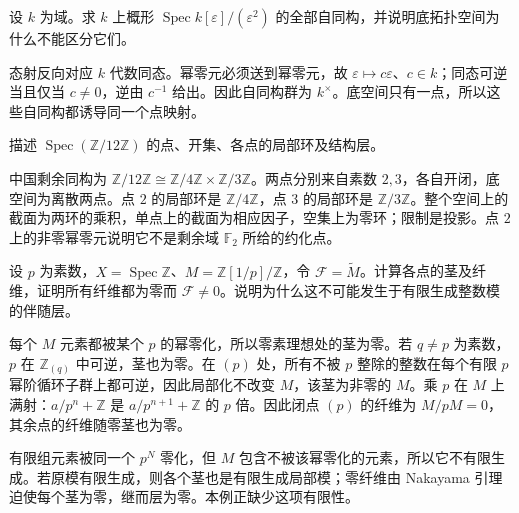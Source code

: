 \begin{optionalexercise}\label{b3:ex:24-infinitesimal-automorphisms}
	设 \(k\) 为域。求 \(k\) 上概形 \(\operatorname{Spec}k[\varepsilon]/(\varepsilon^2)\) 的全部自同构，并说明底拓扑空间为什么不能区分它们。
\end{optionalexercise}
\begin{solution}
	态射反向对应 \(k\) 代数同态。幂零元必须送到幂零元，故 \(\varepsilon\mapsto c\varepsilon\)、\(c\in k\)；同态可逆当且仅当 \(c\ne0\)，逆由 \(c^{-1}\) 给出。因此自同构群为 \(k^\times\)。底空间只有一点，所以这些自同构都诱导同一个点映射。
\end{solution}

\begin{optionalexercise}\label{b3:ex:24-arithmetic-two-points}
	描述 \(\operatorname{Spec}(\mathbb Z/12\mathbb Z)\) 的点、开集、各点的局部环及结构层。
\end{optionalexercise}
\begin{solution}
	中国剩余同构为 \(\mathbb Z/12\mathbb Z\cong\mathbb Z/4\mathbb Z\times\mathbb Z/3\mathbb Z\)。两点分别来自素数 \(2,3\)，各自开闭，底空间为离散两点。点 \(2\) 的局部环是 \(\mathbb Z/4\mathbb Z\)，点 \(3\) 的局部环是 \(\mathbb Z/3\mathbb Z\)。整个空间上的截面为两环的乘积，单点上的截面为相应因子，空集上为零环；限制是投影。点 \(2\) 上的非零幂零元说明它不是剩余域 \(\mathbb F_2\) 所给的约化点。
\end{solution}

\begin{optionalexercise}\label{b3:ex:24-rational-module-fibers}
	设 \(p\) 为素数，\(X=\operatorname{Spec}\mathbb Z\)、\(M=\mathbb Z[1/p]/\mathbb Z\)，令 \(\mathcal F=\widetilde M\)。计算各点的茎及纤维，证明所有纤维都为零而 \(\mathcal F\ne0\)。说明为什么这不可能发生于有限生成整数模的伴随层。
\end{optionalexercise}
\begin{solution}
	每个 \(M\) 元素都被某个 \(p\) 的幂零化，所以零素理想处的茎为零。若 \(q\ne p\) 为素数，\(p\) 在 \(\mathbb Z_{(q)}\) 中可逆，茎也为零。在 \((p)\) 处，所有不被 \(p\) 整除的整数在每个有限 \(p\) 幂阶循环子群上都可逆，因此局部化不改变 \(M\)，该茎为非零的 \(M\)。乘 \(p\) 在 \(M\) 上满射：\(a/p^n+\mathbb Z\) 是 \(a/p^{n+1}+\mathbb Z\) 的 \(p\) 倍。因此闭点 \((p)\) 的纤维为 \(M/pM=0\)，其余点的纤维随零茎也为零。

	有限组元素被同一个 \(p^N\) 零化，但 \(M\) 包含不被该幂零化的元素，所以它不有限生成。若原模有限生成，则各个茎也是有限生成局部模；零纤维由 Nakayama 引理迫使每个茎为零，继而层为零。本例正缺少这项有限性。
\end{solution}

